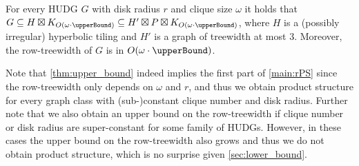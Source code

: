 \documentclass[a4paper,english,cleveref,thm-restate]{lipics-v2021}
\newcommand{\calP}{\ensuremath{\mathcal{P}}\xspace}
\begin{document}
\begin{theorem}\label{thm:upper_bound}
    For every HUDG $ G $ with disk radius $ r $ and clique size $ \omega $ it holds that $ G \subseteq H \boxtimes K_{O(\omega \cdot \upperBound)} \subseteq H' \boxtimes P \boxtimes K_{O(\omega \cdot \upperBound)}$, where $ H $ is a (possibly irregular) hyperbolic tiling and $ H' $ is a graph of treewidth at most $ 3 $.
    Moreover, the row-treewidth of $ G $ is in $ O(\omega \cdot \upperBound) $.
\end{theorem}

Note that \cref{thm:upper_bound} indeed implies the first part of \cref{main:rPS}
since the row-treewidth only depends on $ \omega $ and $ r $, and thus we obtain product structure for every graph class with (sub-)constant clique number and disk radius.
Further note that we also obtain an upper bound on the row-treewidth if clique number or disk radius are super-constant for some family of HUDGs.
However, in these cases the upper bound on the row-treewidth also grows and thus we do not obtain product structure, which is no surprise given \cref{sec:lower_bound}.

\end{document}
